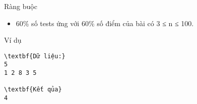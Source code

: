Ràng buộc
\begin{itemize}
	\item 60\% số tests ứng với 60\% số điểm của bài có 3 ≤ n ≤ 100.
\end{itemize}
Ví dụ
\begin{verbatim}
\textbf{Dữ liệu:}
5
1 2 8 3 5

\textbf{Kết qủa}
4
\end{verbatim}